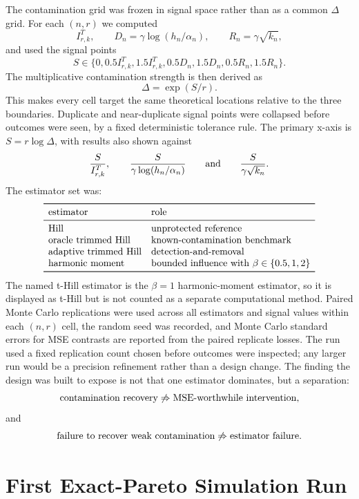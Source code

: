 \documentclass[11pt]{article}
\begin{document}
The contamination grid was frozen in signal space rather than as a common
$\Delta$ grid.  For each $(n,r)$ we computed
\[
  I^{T}_{r,k},
  \qquad
  D_n=\gamma\log(h_n/\alpha_n),
  \qquad
  R_n=\gamma\sqrt{k_n},
\]
and used the signal points
\[
  S\in
  \{0,0.5I^{T}_{r,k},1.5I^{T}_{r,k},0.5D_n,1.5D_n,0.5R_n,1.5R_n\}.
\]
The multiplicative contamination strength is then derived as
\[
  \Delta=\exp(S/r).
\]
This makes every cell target the same theoretical locations relative to the
three boundaries.  Duplicate and near-duplicate signal points were collapsed
before outcomes were seen, by a fixed deterministic tolerance rule.  The
primary x-axis is $S=r\log\Delta$, with results also shown against
\[
  \frac{S}{I^{T}_{r,k}},
  \qquad
  \frac{S}{\gamma\log(h_n/\alpha_n)}
  \qquad\hbox{and}\qquad
  \frac{S}{\gamma\sqrt{k_n}}.
\]
The estimator set was:
\[
\begin{array}{ll}
\toprule
\hbox{estimator} & \hbox{role}\\
\midrule
\hbox{Hill} & \hbox{unprotected reference}\\
\hbox{oracle trimmed Hill} & \hbox{known-contamination benchmark}\\
\hbox{adaptive trimmed Hill} & \hbox{detection-and-removal}\\
\hbox{harmonic moment} &
\hbox{bounded influence with }\beta\in\{0.5,1,2\}\\
\bottomrule
\end{array}
\]
The named t-Hill estimator is the $\beta=1$ harmonic-moment estimator, so it
is displayed as t-Hill but is not counted as a separate computational method.
Paired Monte Carlo replications were used across all estimators and signal
values within each $(n,r)$ cell, the random seed was recorded, and Monte Carlo
standard errors for MSE contrasts are reported from the paired replicate
losses.  The run used a fixed replication count chosen before outcomes were
inspected; any larger run would be a precision refinement rather than a design
change.
The finding the design was built to expose is not that one estimator dominates,
but a separation:
\[
  \hbox{contamination recovery}
  \not\Rightarrow
  \hbox{MSE-worthwhile intervention},
\]
and
\[
  \hbox{failure to recover weak contamination}
  \not\Rightarrow
  \hbox{estimator failure}.
\]

\section{First Exact-Pareto Simulation Run}
\label{sec:first-run}
\end{document}

